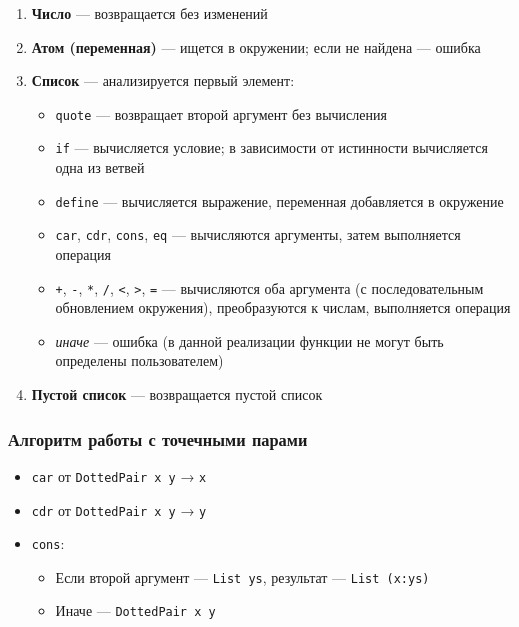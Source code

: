 \documentclass[a4paper,12pt]{article}
\begin{document}
\begin{enumerate}
    \item \textbf{Число} — возвращается без изменений
    \item \textbf{Атом (переменная)} — ищется в окружении; если не найдена — ошибка
    \item \textbf{Список} — анализируется первый элемент:
    \begin{itemize}
        \item \texttt{quote} — возвращает второй аргумент без вычисления
        \item \texttt{if} — вычисляется условие; в зависимости от истинности вычисляется одна из ветвей
        \item \texttt{define} — вычисляется выражение, переменная добавляется в окружение
        \item \texttt{car}, \texttt{cdr}, \texttt{cons}, \texttt{eq} — вычисляются аргументы, затем выполняется операция
        \item \texttt{+}, \texttt{-}, \texttt{*}, \texttt{/}, \texttt{<}, \texttt{>}, \texttt{=} — вычисляются оба аргумента (с последовательным обновлением окружения), преобразуются к числам, выполняется операция
        \item \textit{иначе} — ошибка (в данной реализации функции не могут быть определены пользователем)
    \end{itemize}
    \item \textbf{Пустой список} — возвращается пустой список
\end{enumerate}

\subsubsection{Алгоритм работы с точечными парами}
\begin{itemize}
    \item \texttt{car} от \texttt{DottedPair x y} → \texttt{x}
    \item \texttt{cdr} от \texttt{DottedPair x y} → \texttt{y}
    \item \texttt{cons}:
    \begin{itemize}
        \item Если второй аргумент — \texttt{List ys}, результат — \texttt{List (x:ys)}
        \item Иначе — \texttt{DottedPair x y}
    \end{itemize}
\end{itemize}
\end{document}
